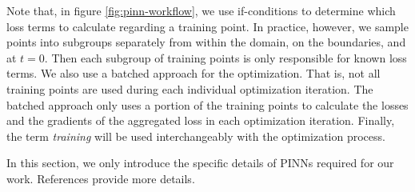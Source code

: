 Note that, in figure \ref{fig:pinn-workflow}, we use if-conditions to determine which loss terms to calculate regarding a training point.
In practice, however, we sample points into subgroups separately from within the domain, on the boundaries, and at $t=0$.
Then each subgroup of training points is only responsible for known loss terms.
We also use a batched approach for the optimization.
That is, not all training points are used during each individual optimization iteration.
The batched approach only uses a portion of the training points to calculate the losses and the gradients of the aggregated loss in each optimization iteration.
Finally, the term {\it training} will be used interchangeably with the optimization process.

In this section, we only introduce the specific details of PINNs required for our work.
References \cite{dissanayake_neural-network-based_1994,lagaris_artificial_1998,cai_physics-informed_2021} provide more details.

